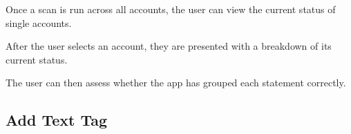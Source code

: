\begin{minipage}{\textwidth}
  \centering
  \begin{minipage}[t]{4.6cm}
    \vspace{0pt}
    \centering
    \begin{minipage}{4.4cm}
      Once a scan is run across all accounts, the user can view the current status of single accounts.
    \end{minipage}
  \end{minipage}
  \begin{minipage}[t]{4.6cm}
    \vspace{0pt}
    \centering
    \begin{minipage}{4.4cm}
      After the user selects an account, they are presented with a breakdown of its current status.
    \end{minipage}
  \end{minipage}
  \begin{minipage}[t]{4.6cm}
    \vspace{0pt}
    \centering
    \begin{minipage}{4.4cm}
      The user can then assess whether the app has grouped each statement correctly.
    \end{minipage}
  \end{minipage}
\end{minipage}

\clearpage

\subsection{Add Text Tag}

